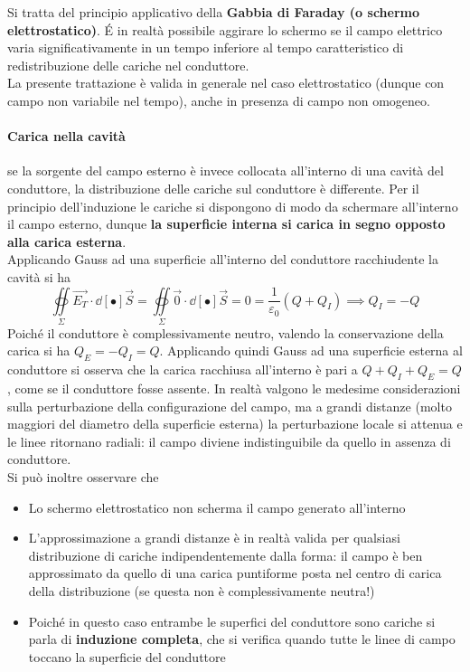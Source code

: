 Si tratta del principio applicativo della \textbf{Gabbia di Faraday (o schermo elettrostatico)}. \'E in realtà possibile aggirare lo schermo se il campo elettrico varia significativamente in un tempo inferiore al tempo caratteristico di redistribuzione delle cariche nel conduttore.
\\La presente trattazione è valida in generale nel caso elettrostatico (dunque con campo non variabile nel tempo), anche in presenza di campo non omogeneo.

\paragraph{Carica nella cavità} se la sorgente del campo esterno è invece collocata all'interno di una cavità del conduttore, la distribuzione delle cariche sul conduttore è differente. Per il principio dell'induzione le cariche si dispongono di modo da schermare all'interno il campo esterno, dunque \textbf{la superficie interna si carica in segno opposto alla carica esterna}.
\\Applicando Gauss ad una superficie all'interno del conduttore racchiudente la cavità si ha
\[\oiint\limits_\Sigma \vec{E_T} \cdot \dd[•]{\vec{S}} = \oiint\limits_\Sigma \vec{0} \cdot \dd[•]{\vec{S}} = 0 = \frac{1}{\varepsilon_0} (Q + Q_I) \implies Q_I = - Q\]
Poiché il conduttore è complessivamente neutro, valendo la conservazione della carica si ha $Q_E = - Q_I = Q$. Applicando quindi Gauss ad una superficie esterna al conduttore si osserva che la carica racchiusa all'interno è pari a $Q + Q_I + Q_E = Q$, come se il conduttore fosse assente. In realtà valgono le medesime considerazioni sulla perturbazione della configurazione del campo, ma a grandi distanze (molto maggiori del diametro della superficie esterna) la perturbazione locale si attenua e le linee ritornano radiali: il campo diviene indistinguibile da quello in assenza di conduttore.
\\Si può inoltre osservare che
\begin{itemize}
\item Lo schermo elettrostatico non scherma il campo generato all'interno
\item L'approssimazione a grandi distanze è in realtà valida per qualsiasi distribuzione di cariche indipendentemente dalla forma: il campo è ben approssimato da quello di una carica puntiforme posta nel centro di carica della distribuzione (se questa non è complessivamente neutra!)
\item Poiché in questo caso entrambe le superfici del conduttore sono cariche si parla di \textbf{induzione completa}, che si verifica quando tutte le linee di campo toccano la superficie del conduttore
\end{itemize} 

